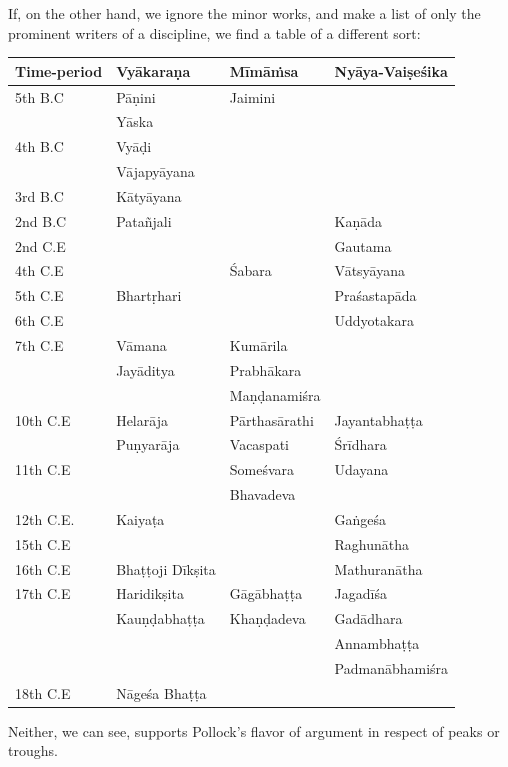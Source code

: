 If, on the other hand, we ignore the minor works, and make a list of only the prominent writers of a discipline, we find a table of a different sort: 
\begin{center}
\begin{tabular}{|l|l|l|l|}
\hline
\textbf{Time-period} & \textbf{Vyākaraṇa} & \textbf{Mīmāṁsa} & \textbf{Nyāya-Vaiṣeśika}\\\hline
5th B.C & Pāṇini &  Jaimini  & \\\hline
& Yāska & & \\\hline
4th B.C & Vyāḍi & & \\\hline
& Vājapyāyana & & \\\hline
3rd B.C & Kātyāyana & & \\\hline
2nd B.C & Patañjali & & Kaṇāda\\\hline
2nd C.E & & & Gautama\\\hline
4th C.E & & Śabara & Vātsyāyana\\\hline
5th C.E & Bhartṛhari & & Praśastapāda\\\hline
6th C.E& & & Uddyotakara\\\hline
7th C.E & Vāmana & Kumārila & \\\hline
& Jayāditya & Prabhākara & \\\hline
& & Maṇḍanamiśra & \\\hline
10th C.E & Helarāja & Pārthasārathi & Jayantabhaṭṭa\\\hline
 & Puṇyarāja & Vacaspati & Śrīdhara\\\hline
11th C.E & & Someśvara & Udayana\\\hline
& & Bhavadeva & \\\hline
12th C.E. & Kaiyaṭa & & Gaṅgeśa\\\hline
15th C.E & & & Raghunātha\\\hline
16th C.E & Bhaṭṭoji Dīkṣita & & Mathuranātha\\\hline
17th C.E & Haridikṣita & Gāgābhaṭṭa & Jagadīśa\\\hline
& Kauṇḍabhaṭṭa & Khaṇḍadeva & Gadādhara\\\hline
& & & Annambhaṭṭa\\\hline
& & & Padmanābhamiśra\\\hline
18th C.E  & Nāgeśa Bhaṭṭa & & \\\hline
\end{tabular}
\end{center}

Neither, we can see, supports Pollock’s flavor of argument in respect of peaks or troughs.

